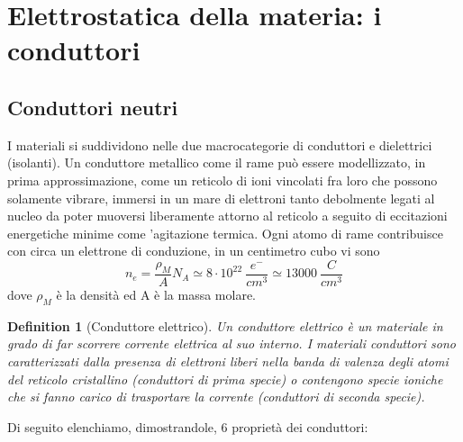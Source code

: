 \documentclass[10pt,a4paper]{article}
\newtheorem{definition}{Definition}
\begin{document}
\section{Elettrostatica della materia: i conduttori}
\subsection{Conduttori neutri}
I materiali si suddividono nelle due macrocategorie di conduttori e dielettrici (isolanti). Un conduttore metallico come il rame può essere modellizzato, in prima approssimazione, come un reticolo di ioni vincolati fra loro che possono solamente vibrare, immersi in un mare di elettroni tanto debolmente legati al nucleo da poter muoversi liberamente attorno al reticolo a seguito di eccitazioni energetiche minime come 'agitazione termica. Ogni atomo di rame contribuisce con circa un elettrone di conduzione, in un centimetro cubo vi sono
\[n_e = \frac{\rho_M }{A}N_A \simeq 8\cdot 10^22\ \frac{e^-}{cm^3}\simeq13000\ \frac{C}{cm^3}\]
dove $\rho_M$ è la densità ed A è la massa molare.
\begin{definition}[Conduttore elettrico]
	Un conduttore elettrico è un materiale in grado di far scorrere corrente elettrica al suo interno. I materiali conduttori sono caratterizzati dalla presenza di elettroni liberi nella banda di valenza degli atomi del reticolo cristallino (conduttori di prima specie) o contengono specie ioniche che si fanno carico di trasportare la corrente (conduttori di seconda specie).
\end{definition}
Di seguito elenchiamo, dimostrandole, 6 proprietà dei conduttori:
\end{document}

